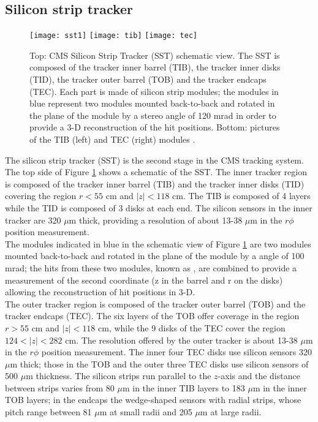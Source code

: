 \subsection{Silicon strip tracker}\label{sst}
\begin{figure}[h!]
  \centering
  \texttt{[image: sst1]}
  \texttt{[image: tib]}
  \texttt{[image: tec]}
  \caption[SST Schematic view.]{Top: CMS Silicon Strip Tracker (SST) schematic view. The SST is composed of the tracker inner barrel (TIB), the tracker inner disks (TID), the tracker outer barrel (TOB) and the tracker endcaps (TEC). Each part is made of silicon strip modules; the modules in blue represent two modules mounted back-to-back and rotated in the plane of the module by a stereo angle of 120 mrad in order to provide a 3-D reconstruction of the hit positions. Bottom: pictures of the TIB (left) and TEC (right) modules \cite{sst,tib,tec}.}
  \label{fig:sst}
\end{figure}

\noindent The silicon strip tracker (SST) is the second stage in the CMS tracking system. The top side of Figure \ref{fig:sst} shows a schematic of the SST. The inner tracker region is composed of the tracker inner barrel (TIB) and the tracker inner disks (TID) covering the region $r<55$ cm and $|z|<118$ cm. The TIB is composed of 4 layers while the TID is composed of 3 disks at each end. The silicon sensors in the inner tracker are 320 $\mu$m thick, providing a resolution of about 13-38 $\mu$m in the $r\phi$ position measurement. \\

\noindent The modules indicated in blue in the schematic view of Figure \ref{fig:sst} are two modules mounted back-to-back and rotated in the plane of the module by a  angle of 100 mrad; the hits from these two modules, known as , are combined to provide a measurement of the second coordinate (z in the barrel and r on the disks) allowing the reconstruction of hit positions in 3-D.\\ 

\noindent The outer tracker region is composed of the tracker outer barrel (TOB) and the tracker endcaps (TEC). The six layers of the TOB offer coverage in the region $r>55$ cm and $|z|<118$ cm, while the 9 disks of the TEC cover the region $124<|z|<282$ cm. The resolution offered by the outer tracker is about 13-38 $\mu$m in the $r\phi$ position measurement. The inner four TEC disks use silicon sensors 320 $\mu$m thick; those in the TOB and the outer three TEC disks use silicon sensors of 500 $\mu$m thickness. The silicon strips run parallel to the $z$-axis and the distance between strips varies from 80 $\mu$m in the inner TIB layers to 183 $\mu$m in the inner TOB layers; in the endcaps the wedge-shaped sensors with radial strips, whose pitch range between 81 $\mu$m at small radii and 205 $\mu$m at large radii.\\ 

